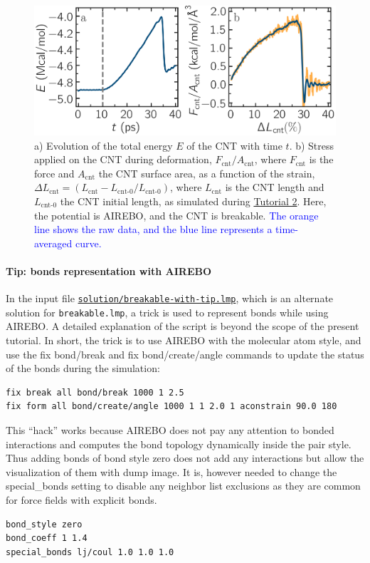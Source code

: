 \documentclass[9pt,tutorial]{livecoms}
\newcommand{\lmpcmd}[1]{\hspace{0pt}\colorbox{listing}{\textcolor{command}{\small{#1}}}\hspace{0pt}} %
\newcommand{\flecmd}[1]{\textcolor{command}{\texttt{#1}}} %
\newcommand{\dwlcmd}[1]{\textcolor{download}{\texttt{#1}}} %
\newcommand{\filepath}{https://raw.githubusercontent.com/lammpstutorials/lammpstutorials-article/main/files/}
\begin{document}
\begin{figure}
\centering
\includegraphics[width=\linewidth]{CNT-breakable-stress-energy}
\caption{a) Evolution of the total energy $E$ of the CNT with time $t$.
b) Stress applied on the CNT during deformation, $F_\text{cnt}/A_\text{cnt}$,
where $F_\text{cnt}$ is the force and $A_\text{cnt}$ the CNT surface area,
as a function of the strain, $\Delta L_\text{cnt} = (L_\text{cnt}-L_\text{cnt-0}/L_\text{cnt-0})$, where
$L_\text{cnt}$ is the CNT length and $L_\text{cnt-0}$ the CNT initial length,
as simulated during \hyperref[carbon-nanotube-label]{Tutorial 2}.
Here, the potential is AIREBO, and the CNT is breakable.  \textcolor{blue}{The orange line
shows the raw data, and the blue line represents a time-averaged curve.}}
\label{fig:CNT-breakable-energy-stress}
\end{figure}

\paragraph{Tip: bonds representation with AIREBO}
\label{tip-dynamic-bonds}

In the input file
\href{\filepath tutorial2/solution/breakable-with-tip.lmp}{\dwlcmd{solution/breakable-with-tip.lmp}},
which is an alternate solution for \flecmd{breakable.lmp}, a trick is
used to represent bonds while using AIREBO.  A detailed explanation of
the script is beyond the scope of the present tutorial.  In short, the
trick is to use AIREBO with the \lmpcmd{molecular} atom style, and use
the \lmpcmd{fix bond/break} and \lmpcmd{fix bond/create/angle} commands
to update the status of the bonds during the simulation:
\begin{lstlisting}
fix break all bond/break 1000 1 2.5
fix form all bond/create/angle 1000 1 1 2.0 1 aconstrain 90.0 180
\end{lstlisting}

This ``hack'' works because AIREBO does not pay any attention to bonded
interactions and computes the bond topology dynamically inside the pair
style.  Thus adding bonds of bond style \lmpcmd{zero} does not add any
interactions but allow the visualization of them with \lmpcmd{dump
  image}.  It is, however needed to change the \lmpcmd{special\_bonds}
setting to disable any neighbor list exclusions as they are common for
force fields with explicit bonds.
\begin{lstlisting}
bond_style zero
bond_coeff 1 1.4
special_bonds lj/coul 1.0 1.0 1.0
\end{lstlisting}
\end{document}
